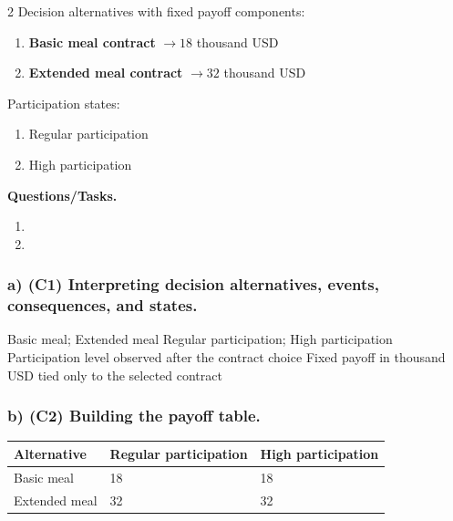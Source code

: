 	\begin{multicols}{2}
		Decision alternatives with fixed payoff components:
		\begin{enumerate}[label=\arabic*.]
			\item \textbf{Basic meal contract} $\to 18$ thousand USD
			\item \textbf{Extended meal contract} $\to 32$ thousand USD
		\end{enumerate}
	
			\columnbreak
	
		Participation states:
		\begin{enumerate}[label=\arabic*.]
			\item Regular participation
			\item High participation
		\end{enumerate}
	\end{multicols}

	\textbf{Questions/Tasks.}
	\begin{enumerate}[label=\textbf{\alph*)}]
		\item {}
		\item {}
	\end{enumerate}
	
	\subsubsection*{a) \textbf{(C1)} Interpreting decision alternatives, events, consequences, and states.}
	\label{subsec:problem16-school-meal-service-contracts-c1}
	\DecisionElementsTable
	{Basic meal; Extended meal}
	{Regular participation; High participation}
	{Participation level observed after the contract choice}
	{Fixed payoff in thousand USD tied only to the selected contract}
	
	
	\subsubsection*{b) \textbf{(C2)} Building the payoff table.}
	\label{subsec:problem16-school-meal-service-contracts-c2}
	\begin{center}
		\begin{tabular}{lll}
			\toprule
			Alternative & Regular participation & High participation \\
			\midrule
			Basic meal & 18 & 18 \\
			Extended meal & 32 & 32 \\
			\bottomrule
		\end{tabular}
	\end{center}
	
